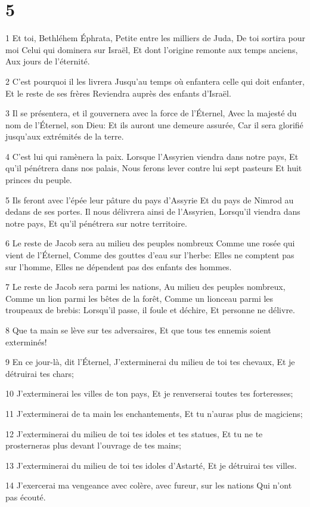 \chapter{5}

\par 1 Et toi, Bethléhem Éphrata, Petite entre les milliers de Juda, De toi sortira pour moi Celui qui dominera sur Israël, Et dont l'origine remonte aux temps anciens, Aux jours de l'éternité.
\par 2 C'est pourquoi il les livrera Jusqu'au temps où enfantera celle qui doit enfanter, Et le reste de ses frères Reviendra auprès des enfants d'Israël.
\par 3 Il se présentera, et il gouvernera avec la force de l'Éternel, Avec la majesté du nom de l'Éternel, son Dieu: Et ils auront une demeure assurée, Car il sera glorifié jusqu'aux extrémités de la terre.
\par 4 C'est lui qui ramènera la paix. Lorsque l'Assyrien viendra dans notre pays, Et qu'il pénétrera dans nos palais, Nous ferons lever contre lui sept pasteurs Et huit princes du peuple.
\par 5 Ils feront avec l'épée leur pâture du pays d'Assyrie Et du pays de Nimrod au dedans de ses portes. Il nous délivrera ainsi de l'Assyrien, Lorsqu'il viendra dans notre pays, Et qu'il pénétrera sur notre territoire.
\par 6 Le reste de Jacob sera au milieu des peuples nombreux Comme une rosée qui vient de l'Éternel, Comme des gouttes d'eau sur l'herbe: Elles ne comptent pas sur l'homme, Elles ne dépendent pas des enfants des hommes.
\par 7 Le reste de Jacob sera parmi les nations, Au milieu des peuples nombreux, Comme un lion parmi les bêtes de la forêt, Comme un lionceau parmi les troupeaux de brebis: Lorsqu'il passe, il foule et déchire, Et personne ne délivre.
\par 8 Que ta main se lève sur tes adversaires, Et que tous tes ennemis soient exterminés!
\par 9 En ce jour-là, dit l'Éternel, J'exterminerai du milieu de toi tes chevaux, Et je détruirai tes chars;
\par 10 J'exterminerai les villes de ton pays, Et je renverserai toutes tes forteresses;
\par 11 J'exterminerai de ta main les enchantements, Et tu n'auras plus de magiciens;
\par 12 J'exterminerai du milieu de toi tes idoles et tes statues, Et tu ne te prosterneras plus devant l'ouvrage de tes mains;
\par 13 J'exterminerai du milieu de toi tes idoles d'Astarté, Et je détruirai tes villes.
\par 14 J'exercerai ma vengeance avec colère, avec fureur, sur les nations Qui n'ont pas écouté.

